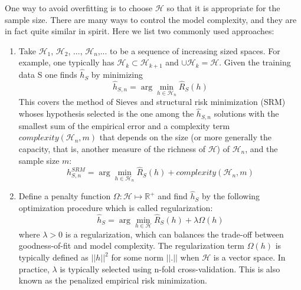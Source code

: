 \noindent One way to avoid overfitting is to choose $\mathcal{H}$ so that it is appropriate for the sample size. There are many ways to control the model complexity, and they are in fact quite similar in spirit. Here we list two commonly used approaches:\\

\begin{enumerate}
	\item Take $\mathcal{H}_1$, $\mathcal{H}_2$, ..., $\mathcal{H}_n$,... to be a sequence of increasing sized spaces. For example, one typically has
	$\mathcal{H}_k \subset \mathcal{H}_{k+1}$ and $\cup \mathcal{H}_k= \mathcal{H}$. Given the training data S one finds $\hat{h}_S$ by minimizing
	\begin{equation}
	\hat{h}_{S,n} = \arg\min_{h \in \mathcal{H}_n} \hat{R}_S(h)
	\end{equation}
	This covers the method of Sieves and structural risk minimization (SRM) whoses hypothesis selected is the
	one among the $\hat{h}_{S,n}$ solutions with the smallest sum of the empirical error and a complexity term $complexity(\mathcal{H}_n,m)$ that depends on the size (or more generally the capacity, that is, another measure of the richness of $\mathcal{H}$) of $\mathcal{H}_n$, and the sample size $m$:
	\begin{equation}
	h^{SRM}_{S,n} = \arg\min_{h \in \mathcal{H}_n} \hat{R}_S(h)+complexity(\mathcal{H}_n,m)
	\end{equation}
	
	\item Define a penalty function $\Omega: \mathcal{H} \mapsto \mathbb{R}^+$ and find $\hat{h}_S$ by the following optimization procedure which is called regularization:
	\begin{equation}
	\hat{h}_S = \arg\min_{h \in \mathcal{H}} \hat{R}_S(h)+ \lambda \Omega(h)
	\end{equation}
	where $\lambda >0$ is a regularization, which can balances the trade-off between goodness-of-fit and model complexity. The regularization term $\Omega(h)$ is typically
	defined as $||h||^2$ for some norm $||.||$ when $\mathcal{H}$ is a vector space. In practice, $\lambda$
	is typically selected using n-fold cross-validation. This is also known as the penalized empirical risk minimization.\\
\end{enumerate}

